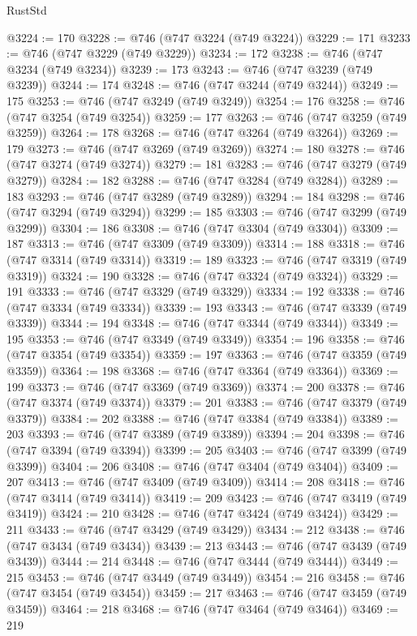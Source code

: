 \begin{lexlean}{RustStd}
\begin{coremodule}
@3224 := 170
@3228 := @746 (@747 @3224 (@749 @3224))
@3229 := 171
@3233 := @746 (@747 @3229 (@749 @3229))
@3234 := 172
@3238 := @746 (@747 @3234 (@749 @3234))
@3239 := 173
@3243 := @746 (@747 @3239 (@749 @3239))
@3244 := 174
@3248 := @746 (@747 @3244 (@749 @3244))
@3249 := 175
@3253 := @746 (@747 @3249 (@749 @3249))
@3254 := 176
@3258 := @746 (@747 @3254 (@749 @3254))
@3259 := 177
@3263 := @746 (@747 @3259 (@749 @3259))
@3264 := 178
@3268 := @746 (@747 @3264 (@749 @3264))
@3269 := 179
@3273 := @746 (@747 @3269 (@749 @3269))
@3274 := 180
@3278 := @746 (@747 @3274 (@749 @3274))
@3279 := 181
@3283 := @746 (@747 @3279 (@749 @3279))
@3284 := 182
@3288 := @746 (@747 @3284 (@749 @3284))
@3289 := 183
@3293 := @746 (@747 @3289 (@749 @3289))
@3294 := 184
@3298 := @746 (@747 @3294 (@749 @3294))
@3299 := 185
@3303 := @746 (@747 @3299 (@749 @3299))
@3304 := 186
@3308 := @746 (@747 @3304 (@749 @3304))
@3309 := 187
@3313 := @746 (@747 @3309 (@749 @3309))
@3314 := 188
@3318 := @746 (@747 @3314 (@749 @3314))
@3319 := 189
@3323 := @746 (@747 @3319 (@749 @3319))
@3324 := 190
@3328 := @746 (@747 @3324 (@749 @3324))
@3329 := 191
@3333 := @746 (@747 @3329 (@749 @3329))
@3334 := 192
@3338 := @746 (@747 @3334 (@749 @3334))
@3339 := 193
@3343 := @746 (@747 @3339 (@749 @3339))
@3344 := 194
@3348 := @746 (@747 @3344 (@749 @3344))
@3349 := 195
@3353 := @746 (@747 @3349 (@749 @3349))
@3354 := 196
@3358 := @746 (@747 @3354 (@749 @3354))
@3359 := 197
@3363 := @746 (@747 @3359 (@749 @3359))
@3364 := 198
@3368 := @746 (@747 @3364 (@749 @3364))
@3369 := 199
@3373 := @746 (@747 @3369 (@749 @3369))
@3374 := 200
@3378 := @746 (@747 @3374 (@749 @3374))
@3379 := 201
@3383 := @746 (@747 @3379 (@749 @3379))
@3384 := 202
@3388 := @746 (@747 @3384 (@749 @3384))
@3389 := 203
@3393 := @746 (@747 @3389 (@749 @3389))
@3394 := 204
@3398 := @746 (@747 @3394 (@749 @3394))
@3399 := 205
@3403 := @746 (@747 @3399 (@749 @3399))
@3404 := 206
@3408 := @746 (@747 @3404 (@749 @3404))
@3409 := 207
@3413 := @746 (@747 @3409 (@749 @3409))
@3414 := 208
@3418 := @746 (@747 @3414 (@749 @3414))
@3419 := 209
@3423 := @746 (@747 @3419 (@749 @3419))
@3424 := 210
@3428 := @746 (@747 @3424 (@749 @3424))
@3429 := 211
@3433 := @746 (@747 @3429 (@749 @3429))
@3434 := 212
@3438 := @746 (@747 @3434 (@749 @3434))
@3439 := 213
@3443 := @746 (@747 @3439 (@749 @3439))
@3444 := 214
@3448 := @746 (@747 @3444 (@749 @3444))
@3449 := 215
@3453 := @746 (@747 @3449 (@749 @3449))
@3454 := 216
@3458 := @746 (@747 @3454 (@749 @3454))
@3459 := 217
@3463 := @746 (@747 @3459 (@749 @3459))
@3464 := 218
@3468 := @746 (@747 @3464 (@749 @3464))
@3469 := 219

\end{coremodule}
\end{lexlean}
